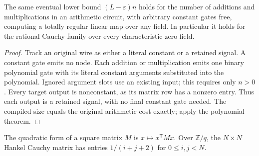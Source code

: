 \begin{theorem}
  \label{thm:lowerbounds-algebraic-arithmetic-free-constants}
  \leanok
  The same eventual lower bound $(L-\varepsilon)n$ holds for the number of
  additions and multiplications in an arithmetic circuit, with arbitrary
  constant gates free, computing a totally regular linear map over any field.
  In particular it holds for the rational Cauchy family over every
  characteristic-zero field.
\end{theorem}
\begin{proof}
  \leanok
  Track an original wire as either a literal constant or a retained signal.
  A constant gate emits no node. Each addition or multiplication emits one
  binary polynomial gate with its literal constant arguments substituted
  into the polynomial. Ignored argument slots use an existing input; this
  requires only $n>0$. Every target output is nonconstant, as its matrix row
  has a nonzero entry. Thus each output is a retained signal, with no final
  constant gate needed. The compiled size equals the original arithmetic
  cost exactly; apply the polynomial theorem.
\end{proof}

\begin{definition}
  \label{def:lowerbounds-algebraic-quadratic-form}
  \leanok
  The quadratic form of a square matrix $M$ is $x\mapsto x^{\mathsf T}Mx$.
  Over $\mathbb{Z}/q$, the $N\times N$ Hankel Cauchy matrix has entries
  $1/(i+j+2)$ for $0\le i,j<N$.
\end{definition}

